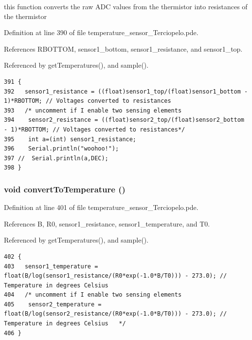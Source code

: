 this function converts the raw ADC values from the thermistor into resistances of the thermistor 



Definition at line 390 of file temperature\_\-sensor\_\-Terciopelo.pde.

References RBOTTOM, sensor1\_\-bottom, sensor1\_\-resistance, and sensor1\_\-top.

Referenced by getTemperatures(), and sample().

\begin{Code}\begin{verbatim}391 {
392   sensor1_resistance = ((float)sensor1_top/(float)sensor1_bottom - 1)*RBOTTOM; // Voltages converted to resistances
393   /* uncomment if I enable two sensing elements
394    sensor2_resistance = ((float)sensor2_top/(float)sensor2_bottom - 1)*RBOTTOM; // Voltages converted to resistances*/
395    int a=(int) sensor1_resistance;
396    Serial.println("woohoo!");
397 //  Serial.println(a,DEC);
398 }
\end{verbatim}
\end{Code}


\hypertarget{temperature__sensor___terciopelo_8pde_3aa4f99331713009a70ee34eba83754b}{
\subsubsection[{convertToTemperature}]{\setlength{\rightskip}{0pt plus 5cm}void convertToTemperature ()}}
\label{temperature__sensor___terciopelo_8pde_3aa4f99331713009a70ee34eba83754b}




Definition at line 401 of file temperature\_\-sensor\_\-Terciopelo.pde.

References B, R0, sensor1\_\-resistance, sensor1\_\-temperature, and T0.

Referenced by getTemperatures(), and sample().

\begin{Code}\begin{verbatim}402 {
403   sensor1_temperature = float(B/log(sensor1_resistance/(R0*exp(-1.0*B/T0))) - 273.0); // Temperature in degrees Celsius
404   /* uncomment if I enable two sensing elements
405    sensor2_temperature = float(B/log(sensor2_resistance/(R0*exp(-1.0*B/T0))) - 273.0); // Temperature in degrees Celsius   */
406 }
\end{verbatim}
\end{Code}


